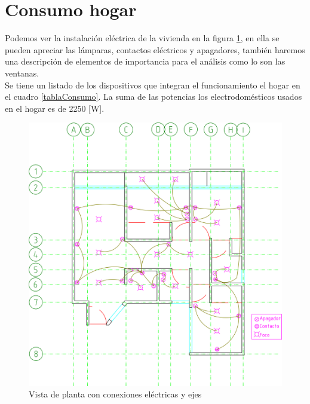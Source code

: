 \documentclass[]{article}
\begin{document}
\section{Consumo hogar}

Podemos ver la instalación eléctrica de la vivienda en la figura \ref{fig:lámparas}, en ella se pueden apreciar las lámparas, contactos eléctricos y apagadores, también haremos una descripción de elementos de importancia para el análisis como lo son las ventanas.\\

 Se tiene un listado de los dispositivos que integran el funcionamiento el hogar en el cuadro \ref{tablaConsumo}. La suma de las potencias los electrodomésticos usados en el hogar es de 2250 [W].\\

\begin{figure}
    \centering
    \includegraphics[width=1\textwidth]{PlanoOcaso}
    \caption{Vista de planta con conexiones eléctricas y ejes}
    \label{fig:lámparas}
\end{figure}

\end{document}

